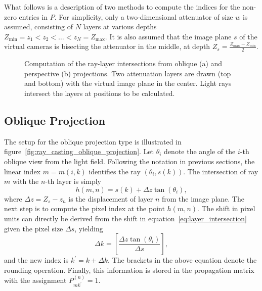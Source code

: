 What follows is a description of two methods to compute the indices for the non-zero entries in $P$. 
For simplicity, only a two-dimensional attenuator of size $w$ is assumed, consisting of $N$ layers at various depths 
$Z_{\text{min}} = z_1 < z_2 < \dots < z_N = Z_{\text{max}}$.
It is also assumed that the image plane $s$ of the virtual cameras is bisecting the attenuator in the middle, at depth 
$Z_s = \frac{Z_{\text{max}} - Z_{\text{min}}}{2}$.
\begin{figure}[tb]
	\subcaptionbox{\label{fig:ray_casting_oblique_projection}}{}\hfill%
	\subcaptionbox{\label{fig:ray_casting_perspective_projection}}{}
	\caption[Computation of the ray-layer intersections from oblique and perspective projections]
			{Computation of the ray-layer intersections from oblique (a) and perspective (b) projections.
			 Two attenuation layers are drawn (top and bottom) with the virtual image plane in the center.
			 Light rays intersect the layers at positions to be calculated.}
\end{figure}

\subsection*{Oblique Projection}

The setup for the oblique projection type is illustrated in figure~\ref{fig:ray_casting_oblique_projection}.
Let $\theta_i$ denote the angle of the \mbox{$i$-th} oblique view from the light field.
Following the notation in previous sections, the linear index $m = m(i, k)$ identifies the ray $(\theta_i, s(k))$.
The intersection of ray $m$ with the \mbox{$n$-th} layer is simply
\begin{equation}\label{eq:layer_intersection}
	h(m, n) = s(k) + \Delta z \tan (\theta_i), 
\end{equation}
where $\Delta z = Z_s - z_n$ is the displacement of layer $n$ from the image plane.
The next step is to compute the pixel index at the point $h(m, n)$.
The shift in pixel units can directly be derived from the shift in equation~\ref{eq:layer_intersection} given the pixel size $\Delta s$, yielding
\begin{equation}
	\Delta k = \left[ \frac{\Delta z \tan (\theta_i)}{\Delta s} \right],
\end{equation}
and the new index is $k^\prime = k + \Delta k$.
The brackets in the above equation denote the rounding operation.
Finally, this information is stored in the propagation matrix with the assignment $P_{m k^\prime}^{(n)} = 1$.

